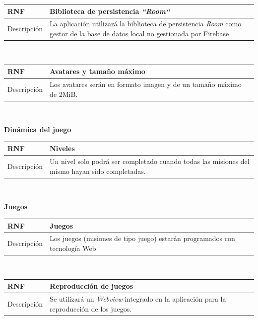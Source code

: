 \documentclass[twoside]{report}
\newcommand\addrow[2]{#1 &#2\\ }
\newcommand\addheading[2]{#1 &#2\\ \hline}
\newcommand\tabularhead{\begin{tabular}{lp{0.7\textwidth}}
\hline
}
\newenvironment{req}{\tabularhead}
{\hline\end{tabular}}
\begin{document}
\vspace{0.25cm}

\begin{req}
	\addheading{\textbf{RNF\arabic{nonFunctionalRequirements}}}{Biblioteca de persistencia \textit{“Room“}}
	\addrow{Descripción}{La aplicación utilizará la biblioteca de persistencia \textit{Room} \cite{roompersistence} como gestor de la base de datos local no gestionada por Firebase}
\end{req}\\

\begin{req}
	\addheading{\textbf{RNF\arabic{nonFunctionalRequirements}}}{Avatares y tamaño máximo}
	\addrow{Descripción}{Los avatares serán en formato imagen y de un tamaño máximo de 2MiB.}
\end{req}\\

\vspace{1cm}


\textbf{Dinámica del juego}

\begin{req}
	\addheading{\textbf{RNF\arabic{nonFunctionalRequirements}}}{Niveles}
	\addrow{Descripción}{Un nivel solo podrá ser completado cuando todas las misiones del mismo hayan sido completadas.}
\end{req}\\

\vspace{1cm}

\textbf{Juegos}\\

\begin{req}
	\addheading{\textbf{RNF\arabic{nonFunctionalRequirements}}}{Juegos}
	\addrow{Descripción}{Los juegos (misiones de tipo juego) estarán programados con tecnología Web}
\end{req}\\

\vspace{0.25cm}

\begin{req}
	\addheading{\textbf{RNF\arabic{nonFunctionalRequirements}}}{Reproducción de juegos}
	\addrow{Descripción}{Se utilizará un \textit{Webview} integrado en la aplicación para la reproducción de los juegos.}
\end{req}\\
\end{document}
